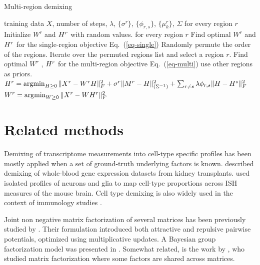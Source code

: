 \documentclass{article} %
\newcommand{\W}{W}
\renewcommand{\eqref}[1]{Eq.~(\ref{#1})}
\begin{document}
\begin{algorithm}[tbh]
   \caption{Multi-region demixing}
   \label{alg:multimix}
   \begin{algorithmic}[1]
    training data $X$, number of steps, $\lambda$, $\{\sigma^r\}$, $\{\phi_{r,s}\}$, $\{\mu^r_k\}$, $\Sigma$
    for every region $r$
   \STATE \quad Initialize $\W^r$ and ${H}^r$ with random values.
    for every region $r$ 
   \STATE \quad Find optimal $\W^r$ and ${H}^r$ for the single-region objective \eqref{eq-single}
   \REPEAT
   \STATE Randomly permute the order of the regions.
   \STATE Iterate over the permuted regions list and select a region $r$.
   \STATE \quad Find optimal $\W^r$ , ${H}^r$ for the multi-region objective \eqref{eq-multi} use other regions as priors.
   \STATE \quad $H^r = \argmin_{H \geq 0 } \| X^r - W^rH\|^2_F + \sigma^r \| M^r - \H \|^2_{(\Sigma^{-1})} + \sum_{r \neq s} \lambda \phi_{r , s} \| \H - \H^s \|_F^2  $
   \STATE \quad $ W^r = \argmin_{W \geq 0} \| X^r - WH^r\|^2_F $
\end{algorithmic}
\end{algorithm}




\section{Related methods}
Demixing of transcriptome measurements into cell-type specific profiles has been mostly applied when a set of ground-truth underlying factors is known. \citet{shen2010cell} described demixing of 
whole-blood gene expression datasets from kidney transplants. \citet{grange2014cell} used isolated profiles of neurons and glia \cite{okaty2011cell} to map cell-type proportions across ISH measures of the mouse brain. Cell type demixing is also widely used in the context of immunology studies \cite{shen2013computational}.

Joint non negative matrix factorization of several matrices has been previously studied by \citet{lee2009group}. Their formulation introduced  both attractive and repulsive pairwise potentials, optimized using multiplicative updates. A Bayesian group factorization model was presented in \citet{shin2012bayesian}. Somewhat related, is the work by \citet{wang2012group}, who studied matrix factorization where some factors are shared across matrices.
\end{document}

